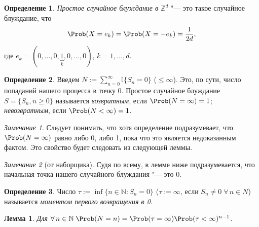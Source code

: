 \documentclass[a4paper]{article}
\newcommand{\ind}{\mathbb I}
\theoremstyle{plain}
\newtheorem{lem}[thm]{Лемма}
\theoremstyle{definition}
\newtheorem{defn}{Определение}[section]
\theoremstyle{remark}
\newtheorem*{rem}{Замечание}
\theoremstyle{nonumberplain}
\theoremstyle{nonumberplain}
\begin{document}
\begin{defn}
  \emph{Простое случайное блуждание в $\mathbb{Z}^{d}$} "--- это такое случайное блуждание, что
  \begin{equation*}
    \Prob(X = e_{k}) = \Prob(X = -e_{k}) = \frac{1}{2d},
  \end{equation*}
  где $e_{k} = (0, \ldots, 0, \underbrace{1}_{k}, 0, \ldots, 0)$, $k = 1, \ldots, d$.
\end{defn}

\begin{defn}
  Введем $N := \sum\limits_{n=0}^\infty \ind \lbrace S_{n} = 0 \rbrace$ ($\leqslant \infty$). Это, по сути, число попаданий нашего процесса в точку 0. Простое случайное блуждание $S = \lbrace S_{n}, n \geqslant 0\rbrace$ называется \emph{возвратным}, если $\Prob(N = \infty) = 1$; \emph{невозвратным}, если $\Prob(N < \infty) = 1$.
\end{defn}

\begin{rem}
  Следует понимать, что хотя определение подразумевает, что $\Prob(N = \infty)$ равно либо 0, либо 1, пока что это является недоказанным фактом. Это свойство будет следовать из следующей леммы.
\end{rem}

\begin{rem}[от наборщика]
  Судя по всему, в лемме ниже подразумевается, что начальная точка нашего случайного блуждания "--- это 0.
\end{rem}
\begin{defn}
  Число $\tau := \inf\lbrace n \in \mathbb{N}\colon S_{n} = 0 \rbrace$ ($\tau := \infty$, если $S_{n} \neq 0\;\forall\, n \in N$) называется \emph{моментом первого возвращения в 0}.
\end{defn}

\begin{lem}
  Для  $ \forall\, n \in \mathbb{N} \; \Prob(N = n)  =  \Prob(\tau = \infty)\Prob(\tau < \infty)^{n-1}$.
\end{lem}
\end{document}
